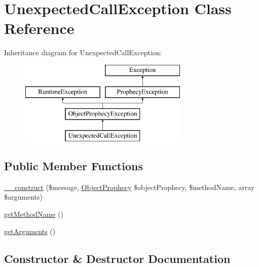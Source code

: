 \hypertarget{class_prophecy_1_1_exception_1_1_call_1_1_unexpected_call_exception}{}\section{Unexpected\+Call\+Exception Class Reference}
\label{class_prophecy_1_1_exception_1_1_call_1_1_unexpected_call_exception}
Inheritance diagram for Unexpected\+Call\+Exception\+:\begin{figure}[H]
\begin{center}
\leavevmode
\includegraphics[height=4.000000cm]{class_prophecy_1_1_exception_1_1_call_1_1_unexpected_call_exception}
\end{center}
\end{figure}
\subsection*{Public Member Functions}
\begin{DoxyCompactItemize}
\item 
\mbox{\hyperlink{class_prophecy_1_1_exception_1_1_call_1_1_unexpected_call_exception_a3523d33b608ff307ccdf6bf92ab8a10a}{\+\_\+\+\_\+construct}} (\$message, \mbox{\hyperlink{class_prophecy_1_1_prophecy_1_1_object_prophecy}{Object\+Prophecy}} \$object\+Prophecy, \$method\+Name, array \$arguments)
\item 
\mbox{\hyperlink{class_prophecy_1_1_exception_1_1_call_1_1_unexpected_call_exception_a0fa2079426d0262e759c4105fa4e9163}{get\+Method\+Name}} ()
\item 
\mbox{\hyperlink{class_prophecy_1_1_exception_1_1_call_1_1_unexpected_call_exception_a1d4c324c5a088be98d99d3efbf3502e1}{get\+Arguments}} ()
\end{DoxyCompactItemize}


\subsection{Constructor \& Destructor Documentation}
\mbox{\label{class_prophecy_1_1_exception_1_1_call_1_1_unexpected_call_exception_a3523d33b608ff307ccdf6bf92ab8a10a}} 

